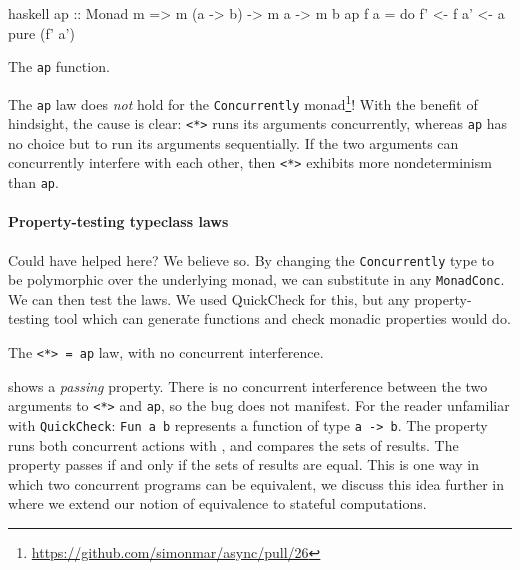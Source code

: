 \begin{listing}
\centering
\begin{cminted}{haskell}
ap :: Monad m => m (a -> b) -> m a -> m b
ap f a = do
  f' <- f
  a' <- a
  pure (f' a')
\end{cminted}
\caption{The \texttt{ap} function.}\label{lst:ap}
\end{listing}

The \verb|ap| law does \emph{not} hold for the \verb|Concurrently|
monad\footnote{\url{https://github.com/simonmar/async/pull/26}}!  With
the benefit of hindsight, the cause is clear: \verb|<*>| runs its
arguments concurrently, whereas \verb|ap| has no choice but to run its
arguments sequentially.  If the two arguments can concurrently
interfere with each other, then \verb|<*>| exhibits more
nondeterminism than \verb|ap|.

\paragraph{Property-testing typeclass laws}
Could \dejafu{} have helped here?  We believe so.  By changing the
\verb|Concurrently| type to be polymorphic over the underlying monad,
we can substitute in any \verb|MonadConc|.  We can then test the laws.
We used QuickCheck \parencite{claessen2000} for this, but any
property-testing tool which can generate functions and check monadic
properties would do.

\begin{listing}
\centering
{}
\caption{The \texttt{<*> = ap} law, with no concurrent interference.}\label{lst:aplaw1}
\end{listing}

 shows a \emph{passing} property.  There is no
concurrent interference between the two arguments to \verb|<*>| and
\verb|ap|, so the bug does not manifest.  For the reader unfamiliar
with \verb|QuickCheck|: \verb|Fun a b| represents a function of type
\verb|a -> b|.  The property runs both concurrent actions with
\dejafu{}, and compares the sets of results.  The property passes if
and only if the sets of results are equal.  This is one way in which
two concurrent programs can be equivalent, we discuss this idea
further in  where we extend our notion of equivalence
to stateful computations.

